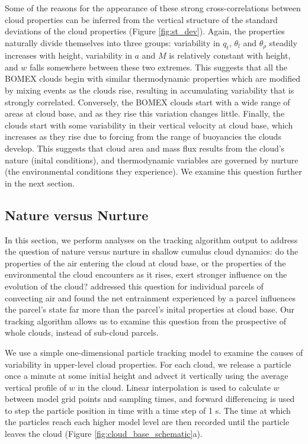 \documentclass[acp]{copernicus}
\begin{document}
Some of the reasons for the appearance of these strong cross-correlations 
between cloud properties can be inferred from the vertical structure of the 
standard deviations of the cloud properties (Figure \ref{fig:st_dev}).  Again, 
the properties naturally divide themselves into three groups: variability in 
$q_t$, $\theta_l$ and $\theta_\rho$ steadily increases with height, 
variability in $a$ and $M$ is relatively constant with height, and $w$ falls 
somewhere between these two extremes.  This suggests that all the BOMEX clouds 
begin with similar thermodynamic properties which are modified by mixing events 
as the clouds rise, resulting in accumulating variability that is strongly 
correlated.  Conversely, the BOMEX clouds start with a wide range of areas at 
cloud base, and as they rise this variation changes little.  Finally, 
the clouds start with some variability in their vertical velocity at cloud 
base, which increases as they rise due to forcing from the range of buoyancies 
the clouds develop.  This suggests that cloud area and mass flux results from 
the cloud's nature (inital conditions), and thermodynamic variables are 
governed by nurture (the environmental conditions they experience).  We examine
this question further in the next section.

\subsection{Nature versus Nurture}

In this section, we perform analyses on the tracking algorithm output to 
address the question of nature versus nurture in shallow cumulus cloud 
dynamics: do the properties of the air entering the cloud at cloud base, or the 
properties of the environmental the cloud encounters as it rises, exert 
stronger influence on the evolution of the cloud?  \cite{Romps2010} addressed 
this question for individual parcels of convecting air and found the net 
entrainment experienced by a parcel influences the parcel's state far more than 
the parcel's inital properties at cloud base.  Our tracking algorithm allows us 
to examine this question from the prospective of whole clouds, instead of 
sub-cloud parcels.

We use a simple one-dimensional particle tracking model to examine the causes 
of variability in upper-level cloud properties.  For each cloud, we release a 
particle once a minute at some initial height and advect it vertically using 
the average vertical profile of $w$ in the cloud.  Linear interpolation is 
used to calculate $w$ between model grid points and sampling times, and forward 
differencing is used to step the particle position in time with a time step of 
1 s.  The time at which the particles reach each higher model level are then 
recorded until the particle leaves the cloud (Figure 
\ref{fig:cloud_base_schematic}a).  
\end{document}
